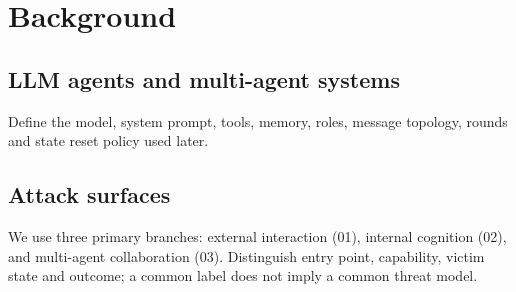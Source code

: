 \section{Background}
\subsection{LLM agents and multi-agent systems}
Define the model, system prompt, tools, memory, roles, message topology, rounds and state reset policy used later.
\subsection{Attack surfaces}
We use three primary branches: external interaction (01), internal cognition (02), and multi-agent collaboration
(03). Distinguish entry point, capability, victim state and outcome; a common label does not imply a common threat
model.
